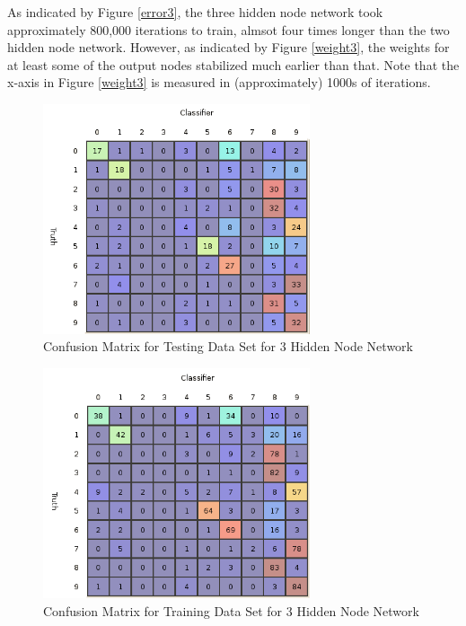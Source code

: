 \documentclass{article}
\begin{document}
As indicated by Figure \ref{error3}, the three hidden node network took approximately 800,000 iterations to train, almsot four times longer than the two hidden node network. However, as indicated by Figure \ref{weight3}, the weights for at least some of the output nodes stabilized much earlier than that. Note that the x-axis in Figure \ref{weight3} is measured in (approximately) 1000s of iterations.

\begin{figure}
\centering
\includegraphics[width=0.7\textwidth]{data/final/3_test_confusion.png}
\caption{Confusion Matrix for Testing Data Set for 3 Hidden Node Network}
\label{testconfusion3}
\end{figure}

\begin{figure}
\centering
\includegraphics[width=0.7\textwidth]{data/final/3_train_confusion.png}
\caption{Confusion Matrix for Training Data Set for 3 Hidden Node Network}
\label{trainconfusion3}
\end{figure}
\end{document}
